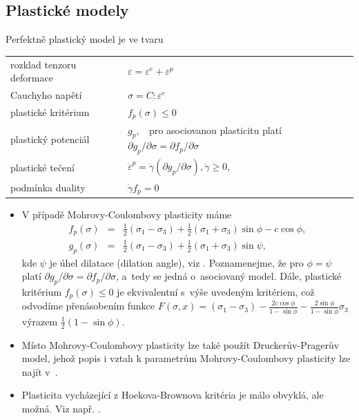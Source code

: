 \documentclass{article}
\newcommand{\alert}[1]{#1}
\begin{document}
\subsection{Plastické modely}
\alert{Perfektně} plastický model je ve tvaru
\begin{table}[ht]
	\centering
	\begin{tabular}{ll}
		\hline
		rozklad tenzoru deformace & $\varepsilon = \varepsilon^e + \varepsilon^p$\\
		Cauchyho napětí & $\sigma = C : \varepsilon^e$\\
		\alert{plastické kritérium} & \alert{$f_p(\sigma)\leq0$}\\
		plastický potenciál & $g_p,\;\;$ \alert{pro asociovanou plasticitu platí} $\partial g_p/\partial \sigma = \partial f_p/\partial \sigma$  \\
		plastické tečení & \alert{$\dot{\varepsilon}^p = \dot{\gamma}(\partial g_p/\partial \sigma), \dot\gamma \geq 0$,}\\
		podmínka duality & $\dot{\gamma} f_p =0$\\
		\hline
	\end{tabular}
\end{table}

\begin{itemize}
	\item V případě Mohrovy-Coulombovy plasticity máme
	\begin{eqnarray*}
		f_p(\sigma) &=& \frac{1}{2} (\sigma_1 - \sigma_3) + \frac{1}{2} (\sigma_1 + \sigma_3)\sin \phi - c \cos \phi, \\
		g_p(\sigma) &=& \frac{1}{2} (\sigma_1 - \sigma_3) + \frac{1}{2} (\sigma_1 + \sigma_3)\sin \psi,
	\end{eqnarray*}
	\alert{kde $\psi$ je úhel dilatace (dilation angle), viz \cite{Neto2011}. Poznamenejme, že pro $\phi = \psi$ platí $\partial g_p/\partial \sigma = \partial f_p/\partial \sigma$, a~tedy se jedná o~asociovaný model. Dále, plastické kritérium $f_p(\sigma)\leq0$ je ekvivalentní s~výše uvedeným kritériem, což odvodíme přenásobením funkce
	$F(\sigma, x) = (\sigma_1 - \sigma_3) - \frac{2c\cos \phi}{1-\sin \phi} - \frac{2\sin \phi}{1-\sin \phi} \sigma_3$ výrazem $\frac{1}{2}(1 - \sin \phi)$.}
	\item Místo Mohrovy-Coulombovy plasticity lze také použít Druckerův-Pragerův model, jehož popis i vztah k parametrům Mohrovy-Coulombovy plasticity lze najít v~\cite{Neto2011}. 
	\item Plasticita vycházející z Hoekova-Brownova kritéria je málo obvyklá, ale možná. Viz např. \cite{Carranza-Torres1999}.
\end{itemize}
\end{document}
